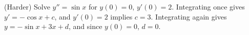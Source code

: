 {(Harder) Solve $y'' = \sin x$ for $y(0)=0$, $y'(0) = 2$.}
{Integrating once gives $y' = -\cos x + c$, and $y'(0)=2$ implies $c=3$. Integrating again gives $y=-\sin x + 3x+d$, and since $y(0)=0$, $d=0$.}